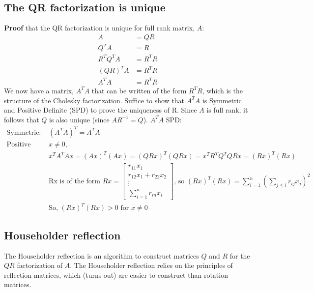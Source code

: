 \documentclass{article}
\begin{document}
\subsection{The QR factorization is unique}
\textbf{Proof} that the QR factorization is unique for full rank matrix, $A$:
\begin{align*}
    A &= QR \\
    Q^TA &= R\\
    R^TQ^TA &= R^TR\\
    (QR)^TA &= R^TR\\
    A^TA &= R^TR
\end{align*}
We now have a matrix, $A^TA$ that can be written of the form $R^TR$, which is the structure of the Cholesky factorization. Suffice to show that $A^TA$ is Symmetric and Positive Definite (SPD) to prove the uniqueness of R. Since $A$ is full rank, it follows that $Q$ is also unique (since $AR^{-1} = Q$). $A^TA$ SPD:
\begin{align*}
    \textrm{Symmetric: }& (A^TA)^T = A^TA\\
    \textrm{Positive definite: for }& x\neq 0,\\
    & x^TA^TAx = (Ax)^T(Ax) =(QRx)^T(QRx) = x^TR^TQ^TQRx =(Rx)^T(Rx)\\
    & \textrm{Rx is of the form } Rx = \begin{bmatrix} r_{11}x_1 \\ r_{12}x_1 + r_{22}x_2 \\ \vdots \\ \sum_{i=1}^n r_{in}x_i\end{bmatrix} \textrm{, so } (Rx)^T(Rx) = \sum_{i=1}^n (\sum_{j \leq i} r_{ij}x_j)^2\\
    &\textrm{So, } (Rx)^T(Rx) >0 \textrm{ for } x \neq 0
\end{align*}

\subsection{Householder reflection}
The Householder reflection is an algorithm to construct matrices $Q$ and $R$ for the $QR$ factorization of $A$. The Householder reflection relies on the principles of reflection matrices, which (turns out) are easier to construct than rotation matrices. 
\end{document}
